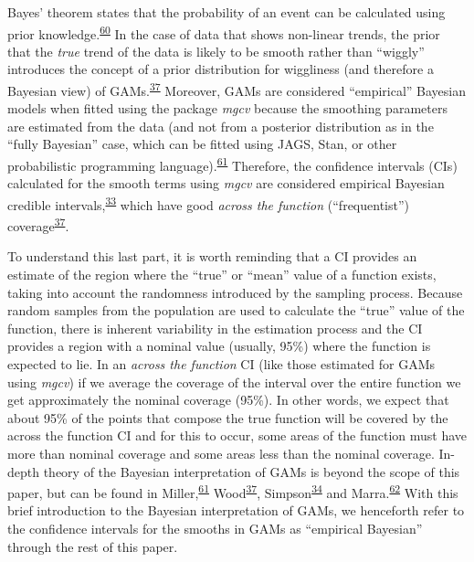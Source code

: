 \documentclass[
]{article}
\begin{document}
Bayes' theorem states that the probability of an event can be calculated using prior knowledge.\textsuperscript{\protect\hyperlink{ref-mcelreath2018}{60}} In the case of data that shows non-linear trends, the prior that the \emph{true} trend of the data is likely to be smooth rather than ``wiggly'' introduces the concept of a prior distribution for wiggliness (and therefore a Bayesian view) of GAMs.\textsuperscript{\protect\hyperlink{ref-wood2017}{37}} Moreover, GAMs are considered ``empirical'' Bayesian models when fitted using the package \emph{mgcv} because the smoothing parameters are estimated from the data (and not from a posterior distribution as in the ``fully Bayesian'' case, which can be fitted using JAGS, Stan, or other probabilistic programming language).\textsuperscript{\protect\hyperlink{ref-miller2019}{61}} Therefore, the confidence intervals (CIs) calculated for the smooth terms using \emph{mgcv} are considered empirical Bayesian credible intervals,\textsuperscript{\protect\hyperlink{ref-pedersen2019}{33}} which have good \emph{across the function} (``frequentist'') coverage\textsuperscript{\protect\hyperlink{ref-wood2017}{37}}.

To understand this last part, it is worth reminding that a CI provides an estimate of the region where the ``true'' or ``mean'' value of a function exists, taking into account the randomness introduced by the sampling process. Because random samples from the population are used to calculate the ``true'' value of the function, there is inherent variability in the estimation process and the CI provides a region with a nominal value (usually, 95\%) where the function is expected to lie. In an \emph{across the function} CI (like those estimated for GAMs using \emph{mgcv}) if we average the coverage of the interval over the entire function we get approximately the nominal coverage (95\%). In other words, we expect that about 95\% of the points that compose the true function will be covered by the across the function CI and for this to occur, some areas of the function must have more than nominal coverage and some areas less than the nominal coverage. In-depth theory of the Bayesian interpretation of GAMs is beyond the scope of this paper, but can be found in Miller,\textsuperscript{\protect\hyperlink{ref-miller2019}{61}} Wood\textsuperscript{\protect\hyperlink{ref-wood2017}{37}}, Simpson\textsuperscript{\protect\hyperlink{ref-simpson2018}{34}} and Marra.\textsuperscript{\protect\hyperlink{ref-marra2012}{62}} With this brief introduction to the Bayesian interpretation of GAMs, we henceforth refer to the confidence intervals for the smooths in GAMs as ``empirical Bayesian'' through the rest of this paper.
\end{document}
